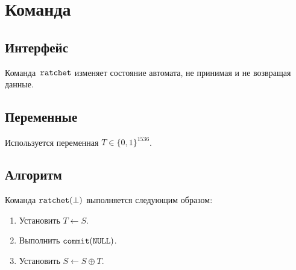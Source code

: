 \section{Команда }\label{PRG.Ratchet}

\subsection{Интерфейс}\label{PRG.Ratchet.IFace}

Команда~$\texttt{ratchet}$ изменяет состояние автомата,
не принимая и не возвращая данные.

\subsection{Переменные}\label{PRG.Ratchet.Vars}

Используется переменная $T\in\{0,1\}^{1536}$.

\subsection{Алгоритм}\label{PRG.Ratchet.Alg}

Команда $\texttt{ratchet}(\perp)$ выполняется следующим образом:
\begin{enumerate}
\item
Установить
$T\leftarrow S$.
\item
Выполнить
$\texttt{commit}(\texttt{NULL})$.
\item
Установить
$S\leftarrow S\oplus T$.
%
%
\end{enumerate}
